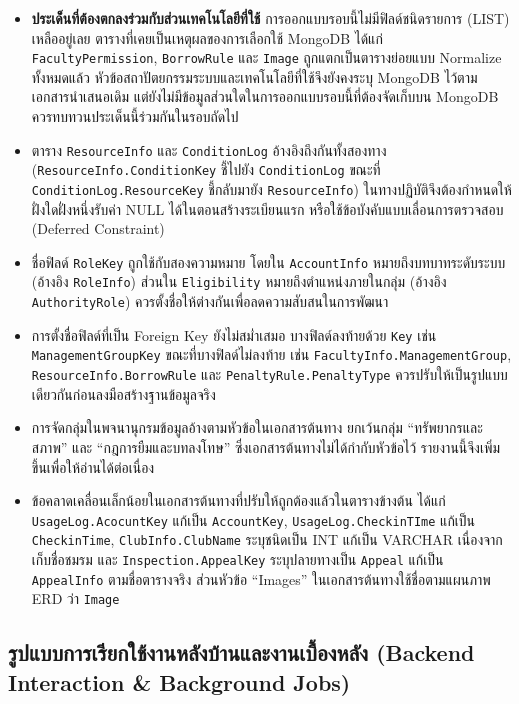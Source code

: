 \begin{itemize}
  \item \textbf{ประเด็นที่ต้องตกลงร่วมกับส่วนเทคโนโลยีที่ใช้} การออกแบบรอบนี้ไม่มีฟิลด์ชนิดรายการ (LIST) เหลืออยู่เลย ตารางที่เคยเป็นเหตุผลของการเลือกใช้ MongoDB ได้แก่ \texttt{FacultyPermission}, \texttt{BorrowRule} และ \texttt{Image} ถูกแตกเป็นตารางย่อยแบบ Normalize ทั้งหมดแล้ว หัวข้อสถาปัตยกรรมระบบและเทคโนโลยีที่ใช้จึงยังคงระบุ MongoDB ไว้ตามเอกสารนำเสนอเดิม แต่ยังไม่มีข้อมูลส่วนใดในการออกแบบรอบนี้ที่ต้องจัดเก็บบน MongoDB ควรทบทวนประเด็นนี้ร่วมกันในรอบถัดไป
  \item ตาราง \texttt{ResourceInfo} และ \texttt{ConditionLog} อ้างอิงถึงกันทั้งสองทาง (\texttt{ResourceInfo.ConditionKey} ชี้ไปยัง \texttt{ConditionLog} ขณะที่ \texttt{ConditionLog.ResourceKey} ชี้กลับมายัง \texttt{ResourceInfo}) ในทางปฏิบัติจึงต้องกำหนดให้ฝั่งใดฝั่งหนึ่งรับค่า NULL ได้ในตอนสร้างระเบียนแรก หรือใช้ข้อบังคับแบบเลื่อนการตรวจสอบ (Deferred Constraint)
  \item ชื่อฟิลด์ \texttt{RoleKey} ถูกใช้กับสองความหมาย โดยใน \texttt{AccountInfo} หมายถึงบทบาทระดับระบบ (อ้างอิง \texttt{RoleInfo}) ส่วนใน \texttt{Eligibility} หมายถึงตำแหน่งภายในกลุ่ม (อ้างอิง \texttt{AuthorityRole}) ควรตั้งชื่อให้ต่างกันเพื่อลดความสับสนในการพัฒนา
  \item การตั้งชื่อฟิลด์ที่เป็น Foreign Key ยังไม่สม่ำเสมอ บางฟิลด์ลงท้ายด้วย \texttt{Key} เช่น \texttt{ManagementGroupKey} ขณะที่บางฟิลด์ไม่ลงท้าย เช่น \texttt{FacultyInfo.ManagementGroup}, \texttt{ResourceInfo.BorrowRule} และ \texttt{PenaltyRule.PenaltyType} ควรปรับให้เป็นรูปแบบเดียวกันก่อนลงมือสร้างฐานข้อมูลจริง
  \item การจัดกลุ่มในพจนานุกรมข้อมูลอ้างตามหัวข้อในเอกสารต้นทาง ยกเว้นกลุ่ม ``ทรัพยากรและสภาพ'' และ ``กฎการยืมและบทลงโทษ'' ซึ่งเอกสารต้นทางไม่ได้กำกับหัวข้อไว้ รายงานนี้จึงเพิ่มขึ้นเพื่อให้อ่านได้ต่อเนื่อง
  \item ข้อคลาดเคลื่อนเล็กน้อยในเอกสารต้นทางที่ปรับให้ถูกต้องแล้วในตารางข้างต้น ได้แก่ \texttt{UsageLog.AcocuntKey} แก้เป็น \texttt{AccountKey}, \texttt{UsageLog.CheckinTIme} แก้เป็น \texttt{CheckinTime}, \texttt{ClubInfo.ClubName} ระบุชนิดเป็น INT แก้เป็น VARCHAR เนื่องจากเก็บชื่อชมรม และ \texttt{Inspection.AppealKey} ระบุปลายทางเป็น \texttt{Appeal} แก้เป็น \texttt{AppealInfo} ตามชื่อตารางจริง ส่วนหัวข้อ ``Images'' ในเอกสารต้นทางใช้ชื่อตามแผนภาพ ERD ว่า \texttt{Image}
\end{itemize}

\clearpage
\subsection{รูปแบบการเรียกใช้งานหลังบ้านและงานเบื้องหลัง (Backend Interaction \& Background Jobs)}

